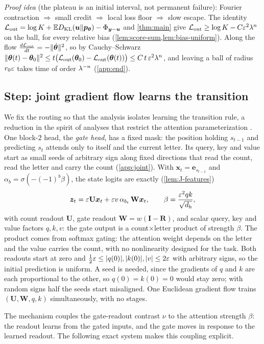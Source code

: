 \emph{Proof idea} (the plateau is an initial interval, not permanent failure): Fourier contraction $\Rightarrow$ small credit $\Rightarrow$ local loss floor $\Rightarrow$ slow escape. The identity
$\mathcal L_{\mathrm{out}}=\log K+\mathbb ED_{\mathrm{KL}}(\bm u\|\bm p_{\bm\theta})-\Phi_{\bm y-\bm u}$ and \cref{thm:main} give $\mathcal L_{\mathrm{out}}\ge\log K-C\varepsilon^2\lambda^n$ on the ball, for
every relative bias (\cref{lem:score-sum,lem:bias-uniform}). Along the flow $\frac{d\mathcal L_{\mathrm{out}}}{dt}=-\|\dot{\bm\theta}\|^2$, so by Cauchy--Schwarz
$\|\bm\theta(t)-\bm\theta_0\|^2\le t\bigl(\mathcal L_{\mathrm{out}}(\bm\theta_0)-\mathcal L_{\mathrm{out}}(\bm\theta(t))\bigr)\le C\,t\,\varepsilon^2\lambda^n$,
and leaving a ball of radius $r_0\varepsilon$ takes time of order $\lambda^{-n}$ (\cref{app:end}).

\subsection{Step: joint gradient flow learns the transition}
\label{sec:step}
We fix the routing so that the analysis isolates learning the transition rule, a reduction in the spirit of analyses that restrict the
attention parameterization \citep{kim2024parity}. One block-$2$ head, the \emph{gate head}, has a fixed mask: the position holding $s_{t-1}$ and
predicting $s_t$ attends only to itself and the current letter. Its query, key and value start as small seeds of arbitrary sign along fixed directions
that read the count, read the letter and carry the count (\cref{app:joint}). With $\bm x_t=\bm e_{s_{t-1}}$ and $\alpha_b=\sigma(-(-1)^b\beta)$, the state logits are
exactly (\cref{lem:J-features})
\[
 \bm z_t=\varepsilon \mathbf U\bm x_t+\varepsilon v\,\alpha_{b_t}\,\mathbf W\bm x_t,
 \qquad \beta=\frac{\varepsilon^2qk}{\sqrt{d_{\mathrm h}}},
\]
with count readout $\mathbf U$, gate readout $\mathbf W=w(\mathbf I-\mathbf R)$, and scalar query, key and value factors $q,k,v$: the gate output is
a count$\times$letter product of strength $\beta$. The product comes from softmax gating: the attention weight depends on the letter and the
value carries the count, with no nonlinearity designed for the task. Both readouts start at zero and $\frac12\varepsilon\le|q(0)|,|k(0)|,|v|\le2\varepsilon$ with arbitrary
signs, so the initial prediction is uniform. A seed is needed, since the gradients of $q$ and $k$ are each proportional to the other, so
$q(0)=k(0)=0$ would stay zero; with random signs half the seeds start misaligned. One Euclidean gradient flow trains
$(\mathbf U,\mathbf W,q,k)$ simultaneously, with no stages.

The mechanism couples the gate-readout contrast $\nu$ to the attention strength $\beta$: the readout learns from the gated inputs,
and the gate moves in response to the learned readout. The following exact system makes this coupling explicit.


